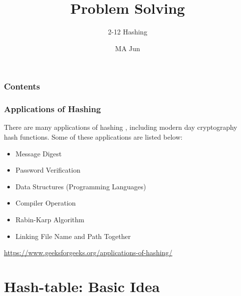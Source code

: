 \documentclass[UTF8,11pt]{beamer}
\begin{document}
	\author{MA Jun}
	\title{Problem Solving}
	\subtitle{2-12 Hashing}
\begin{frame}[plain]
	\maketitle
\end{frame}
\begin{frame}           %
	\addtocounter{framenumber}{-2}%
	\frametitle{Contents}
	\thispagestyle{empty}
	\tableofcontents[hideallsubsections]
\end{frame}

\begin{frame}
\frametitle{Applications of Hashing}
There are many applications of hashing , including modern day cryptography hash functions. Some of these applications are listed below:
\begin{itemize}
	\item Message Digest
	\item Password Verification
	\item Data Structures (Programming Languages)
	\item Compiler Operation
	\item Rabin-Karp Algorithm
	\item Linking File Name and Path Together
\end{itemize}
{\tiny
	\href{https://www.geeksforgeeks.org/applications-of-hashing/}{https://www.geeksforgeeks.org/applications-of-hashing/}
}
\end{frame}

\section{Hash-table: Basic Idea}
\end{document}
